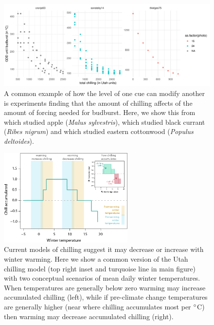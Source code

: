 \documentclass[11pt,letter]{article}
\begin{document}
\clearpage
\begin{figure}
\centering
\includegraphics[width=1\textwidth]{..//..//analyses/limitingcues/figures/gddbyutah.pdf}
\caption{A common example of how the level of one cue can modify another is experiments finding that the amount of chilling affects of the amount of forcing  needed for budburst. Here, we show this from \citet{Cronje:2003aa} which studied apple (\emph{Malus sylvestris}), \citet{Sonsteby:2014aa} which studied black currant (\emph{Ribes nigrum}) and \citet{Thielges:1976aa} which studied eastern cottonwood (\emph{Populus deltoides}).}
  \label{fig:gddbyutah} 
\end{figure}


\begin{figure}[t!]
\centering
\includegraphics[width=0.6\textwidth]{figures/utahchill_limiting.png}
\caption{Current models of chilling suggest it may decrease or increase with winter warming. Here we show a common version of the Utah chilling model (top right inset and turquoise line in main figure) with two conceptual scenarios of mean daily winter temperatures. When temperatures are generally below zero warming may increase accumulated chilling (left), while if pre-climate change temperatures are generally higher (near where chilling accumulates most per $\degree$C) then warming may decrease accumulated chilling (right).}
  \label{fig:chilling}
\end{figure}
\end{document}
